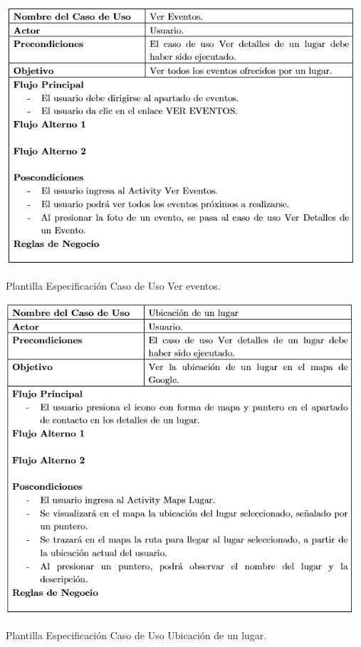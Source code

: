 \documentclass[12pt,letterpaper,openany]{book}
\begin{document}
\begin{table}[H]
\centering
\includegraphics[width=13cm]{./imagenes/PCU/ver_eventos}
\caption{Plantilla Especificación Caso de Uso Ver eventos.}
\end{table}

\begin{table}[H]
\centering
\includegraphics[width=13cm]{./imagenes/PCU/ubicacion_lugar}
\caption{Plantilla Especificación Caso de Uso Ubicación de un lugar.}
\end{table}
\end{document}
